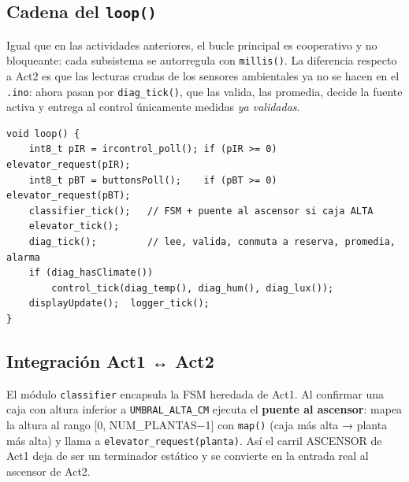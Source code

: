 \subsection{Cadena del \texttt{loop()}}

Igual que en las actividades anteriores, el bucle principal es cooperativo y
no bloqueante: cada subsistema se autorregula con \texttt{millis()}. La
diferencia respecto a Act2 es que las lecturas crudas de los sensores
ambientales ya no se hacen en el \texttt{.ino}: ahora pasan por
\texttt{diag\_tick()}, que las valida, las promedia, decide la fuente activa
y entrega al control únicamente medidas \emph{ya validadas}.

\begin{lstlisting}[caption={Cadena del \texttt{loop()} integrado.},
                   label={lst:loop}]
void loop() {
    int8_t pIR = ircontrol_poll(); if (pIR >= 0) elevator_request(pIR);
    int8_t pBT = buttonsPoll();    if (pBT >= 0) elevator_request(pBT);
    classifier_tick();   // FSM + puente al ascensor si caja ALTA
    elevator_tick();
    diag_tick();         // lee, valida, conmuta a reserva, promedia, alarma
    if (diag_hasClimate())
        control_tick(diag_temp(), diag_hum(), diag_lux());
    displayUpdate();  logger_tick();
}
\end{lstlisting}

\subsection{Integración Act1 ↔ Act2}

El módulo \texttt{classifier} encapsula la FSM heredada de Act1. Al confirmar
una caja con altura inferior a \texttt{UMBRAL\_ALTA\_CM} ejecuta el
\textbf{puente al ascensor}: mapea la altura al rango
[0, NUM_PLANTAS−1] con \texttt{map()} (caja más alta
→ planta más alta) y llama a \texttt{elevator\_request(planta)}.
Así el carril ASCENSOR de Act1 deja de ser un terminador estático y se
convierte en la entrada real al ascensor de Act2.
